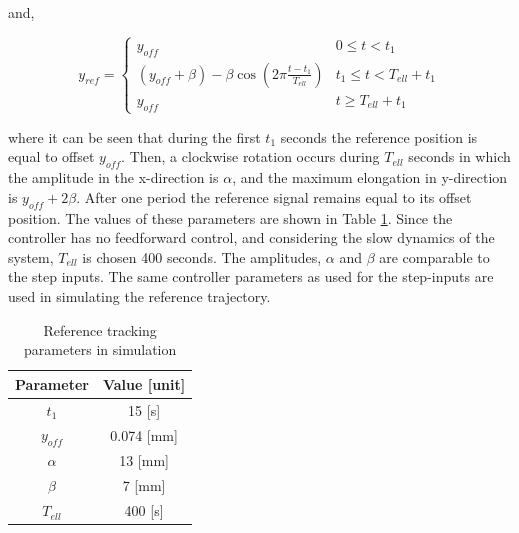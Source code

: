 and,


\begin{equation}
    y_{ref} = \begin{cases} 
       y_{off} &  0 \leq t < t_1 \\
     (y_{off} +\beta) -  \beta \cos(2\pi \frac{t - t_1}{T_{ell}}) & t_1 \leq t < T_{ell} + t_1 \\
     y_{off} & t \geq T_{ell} + t_1
   \end{cases}  
   \end{equation}

where it can be seen that during the first $t_1$ seconds the reference position is equal to offset $y_{off}$. Then, a clockwise rotation occurs during $T_{ell}$ seconds in which the amplitude in the x-direction is $\alpha$, and the maximum elongation in y-direction is $y_{off} + 2\beta$. After one period the reference signal remains equal to its offset position. The values of these parameters are shown in Table \ref{tab5:refparamssim}. Since the controller has no feedforward control, and considering the slow dynamics of the system, $T_{ell}$ is chosen 400 seconds. The amplitudes, $\alpha$ and $\beta$ are comparable to the step inputs. The same controller parameters as used for the step-inputs are used in simulating the reference trajectory.


\begin{table}[H]
    \centering
    \caption{Reference tracking parameters in simulation}
    \begin{tabular}{|c|c|} \hline
   \textbf{Parameter}  & \textbf{Value [unit]} \\ \hline
    $t_1$ &   15 [s]  \\ 
    $y_{off}$ & 0.074 [mm] \\
    $\alpha$ & 13 [mm] \\
    $\beta$ & 7 [mm] \\
    $T_{ell}$ & 400 [s] \\ \hline
\end{tabular}
    \label{tab5:refparamssim}
\end{table}


